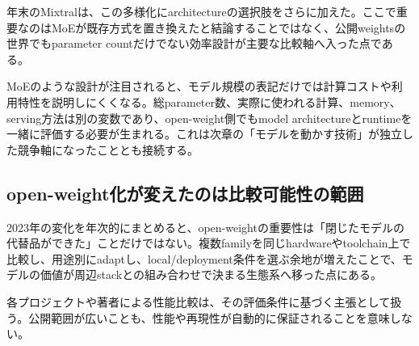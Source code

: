 年末のMixtralは、この多様化にarchitectureの選択肢をさらに加えた。ここで重要なのはMoEが既存方式を置き換えたと結論することではなく、公開weightsの世界でもparameter countだけでない効率設計が主要な比較軸へ入った点である。\autocite{src-00c370ab2324,src-dd2cfa98160d,src-f0349196879e}


MoEのような設計が注目されると、モデル規模の表記だけでは計算コストや利用特性を説明しにくくなる。総parameter数、実際に使われる計算、memory、serving方法は別の変数であり、open-weight側でもmodel architectureとruntimeを一緒に評価する必要が生まれる。これは次章の「モデルを動かす技術」が独立した競争軸になったこととも接続する。\autocite{src-00c370ab2324,src-dd2cfa98160d,src-f0349196879e}


\subsection{open-weight化が変えたのは比較可能性の範囲}

2023年の変化を年次的にまとめると、open-weightの重要性は「閉じたモデルの代替品ができた」ことだけではない。複数familyを同じhardwareやtoolchain上で比較し、用途別にadaptし、local/deployment条件を選ぶ余地が増えたことで、モデルの価値が周辺stackとの組み合わせで決まる生態系へ移った点にある。\autocite{src-00c370ab2324,src-1fd43f93adcc,src-240ca564b6b8,src-3db09fede330,src-5c8e2db8871a,src-74aa7e2a7ca4,src-81f670ec1e74,src-8bdb904686fb,src-9df482e2c96c,src-b7e5243e6d59,src-bc7aba201f01,src-d4b6359bbad1,src-dd2cfa98160d,src-f0349196879e}


\begin{claimboundary}
各プロジェクトや著者による性能比較は、その評価条件に基づく主張として扱う。公開範囲が広いことも、性能や再現性が自動的に保証されることを意味しない。\autocite{src-240ca564b6b8,src-3db09fede330,src-8bdb904686fb,src-9df482e2c96c,src-b7e5243e6d59,src-bc7aba201f01}
\end{claimboundary}

